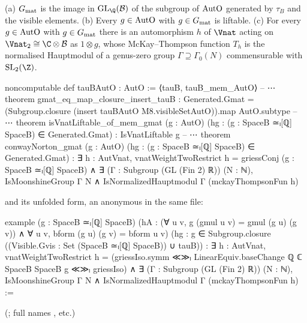 \begin{theorem}\label{ch22:thm:gmat}
(a) $G_{\mathrm{mat}}$ is the image in $\mathrm{GL}_\Q(\chtwentytwoB)$ of the subgroup of $\mathrm{AutO}$ generated by $\tau_B$ and
the visible elements.
(b) Every $g\in\mathrm{AutO}$ with $g\in G_{\mathrm{mat}}$ is liftable.
(c) For every $g\in\mathrm{AutO}$ with $g\in G_{\mathrm{mat}}$ there is an automorphism $h$ of $\Vnat$ acting on
$\Vnat_2\cong\C\otimes\chtwentytwoB$ as $1\otimes g$, whose McKay--Thompson function $T_h$ is the normalised Hauptmodul of a
genus-zero group $\Gamma\supseteq\Gamma_0(N)$ commensurable with $\mathrm{SL}_2(\Z)$.
\end{theorem}
\begin{leancode}
noncomputable def tauBAutO : AutO := ⟨tauB, tauB_mem_AutO⟩
-- ⋯
theorem gmat_eq_map_closure_insert_tauB :
    Generated.Gmat = (Subgroup.closure (insert tauBAutO M8.visibleSetAutO)).map AutO.subtype
-- ⋯
theorem isVnatLiftable_of_mem_gmat (g : AutO)
    (hg : (g : SpaceB ≃ₗ[ℚ] SpaceB) ∈ Generated.Gmat) : IsVnatLiftable g
-- ⋯
theorem conwayNorton_gmat (g : AutO) (hg : (g : SpaceB ≃ₗ[ℚ] SpaceB) ∈ Generated.Gmat) :
    ∃ h : AutVnat, vnatWeightTwoRestrict h = griessConj (g : SpaceB ≃ₗ[ℚ] SpaceB) ∧
      ∃ (Γ : Subgroup (GL (Fin 2) ℝ)) (N : ℕ), IsMoonshineGroup Γ N ∧
        IsNormalizedHauptmodul Γ (mckayThompsonFun h)
\end{leancode}
and its unfolded form, an anonymous  in the same file:
\begin{leancode}
example (g : SpaceB ≃ₗ[ℚ] SpaceB)
    (hA : (∀ u v, g (gmul u v) = gmul (g u) (g v)) ∧ ∀ u v, bform (g u) (g v) = bform u v)
    (hg : g ∈ Subgroup.closure ((Visible.Gvis : Set (SpaceB ≃ₗ[ℚ] SpaceB)) ∪ {tauB})) :
    ∃ h : AutVnat, vnatWeightTwoRestrict h
        = (griessIso.symm ≪≫ₗ LinearEquiv.baseChange ℚ ℂ SpaceB SpaceB g ≪≫ₗ griessIso) ∧
      ∃ (Γ : Subgroup (GL (Fin 2) ℝ)) (N : ℕ), IsMoonshineGroup Γ N ∧
        IsNormalizedHauptmodul Γ (mckayThompsonFun h) :=
\end{leancode}
(; full names ,
etc.)
